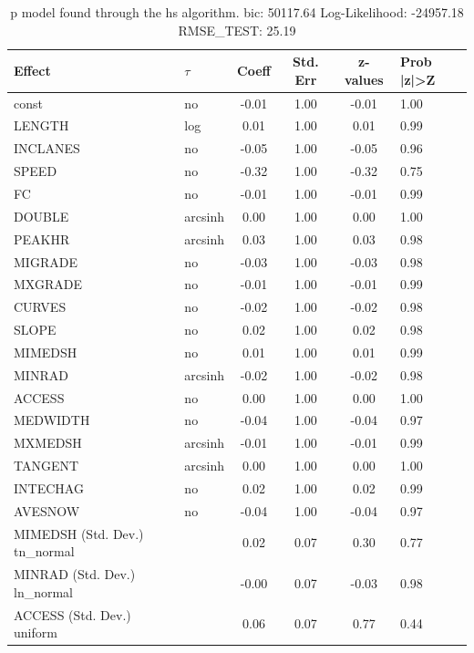 \begin{table}
	\caption{p model found through the hs algorithm. bic: 50117.64 Log-Likelihood: -24957.18 RMSE_TEST: 25.19}
	\begin{center}
		\begin{tabular}{|l|l|c|c|c|l|}
			\hline
			Effect & $\tau$ & Coeff & Std. Err & z-values & Prob |z|>Z \\
			\hline
			const & no & -0.01 & 1.00 & -0.01 & 1.00 \\
			\hline
			LENGTH & log & 0.01 & 1.00 & 0.01 & 0.99 \\
			\hline
			INCLANES & no & -0.05 & 1.00 & -0.05 & 0.96 \\
			\hline
			SPEED & no & -0.32 & 1.00 & -0.32 & 0.75 \\
			\hline
			FC & no & -0.01 & 1.00 & -0.01 & 0.99 \\
			\hline
			DOUBLE & arcsinh & 0.00 & 1.00 & 0.00 & 1.00 \\
			\hline
			PEAKHR & arcsinh & 0.03 & 1.00 & 0.03 & 0.98 \\
			\hline
			MIGRADE & no & -0.03 & 1.00 & -0.03 & 0.98 \\
			\hline
			MXGRADE & no & -0.01 & 1.00 & -0.01 & 0.99 \\
			\hline
			CURVES & no & -0.02 & 1.00 & -0.02 & 0.98 \\
			\hline
			SLOPE & no & 0.02 & 1.00 & 0.02 & 0.98 \\
			\hline
			MIMEDSH & no & 0.01 & 1.00 & 0.01 & 0.99 \\
			\hline
			MINRAD & arcsinh & -0.02 & 1.00 & -0.02 & 0.98 \\
			\hline
			ACCESS & no & 0.00 & 1.00 & 0.00 & 1.00 \\
			\hline
			MEDWIDTH & no & -0.04 & 1.00 & -0.04 & 0.97 \\
			\hline
			MXMEDSH & arcsinh & -0.01 & 1.00 & -0.01 & 0.99 \\
			\hline
			TANGENT & arcsinh & 0.00 & 1.00 & 0.00 & 1.00 \\
			\hline
			INTECHAG & no & 0.02 & 1.00 & 0.02 & 0.99 \\
			\hline
			AVESNOW & no & -0.04 & 1.00 & -0.04 & 0.97 \\
			\hline
			MIMEDSH (Std. Dev.) tn_normal &  & 0.02 & 0.07 & 0.30 & 0.77 \\
			\hline
			MINRAD (Std. Dev.) ln_normal &  & -0.00 & 0.07 & -0.03 & 0.98 \\
			\hline
			ACCESS (Std. Dev.) uniform &  & 0.06 & 0.07 & 0.77 & 0.44 \\

\end{tabular}
\end{center}
\end{table}

